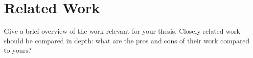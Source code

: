 \chapter{Related Work}\label{chap:relatedwork}
Give a brief overview of the work relevant for your thesis.
Closely related work should be compared in depth: what are the pros and cons of their work compared to yours?

